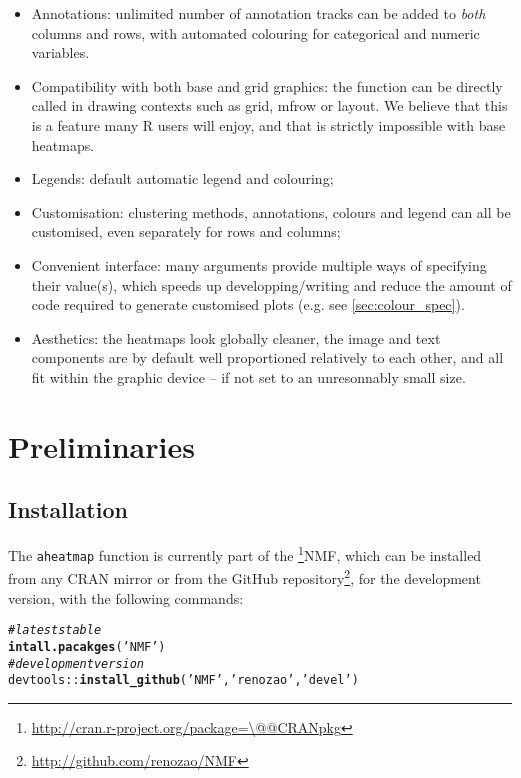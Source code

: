 \documentclass[a4paper]{article}\usepackage[]{graphicx}\usepackage[]{color}
\makeatletter
\newcommand{\hlstr}[1]{\textcolor[rgb]{0.192,0.494,0.8}{#1}}%
\newcommand{\hlcom}[1]{\textcolor[rgb]{0.678,0.584,0.686}{\textit{#1}}}%
\newcommand{\hlstd}[1]{\textcolor[rgb]{0.345,0.345,0.345}{#1}}%
\newcommand{\hlkwd}[1]{\textcolor[rgb]{0.737,0.353,0.396}{\textbf{#1}}}%
\newenvironment{kframe}{%
 \def\at@end@of@kframe{}%
 \ifinner\ifhmode%
  \def\at@end@of@kframe{\end{minipage}}%
  \begin{minipage}{\columnwidth}%
 \fi\fi%
 \def\FrameCommand##1{\hskip\@totalleftmargin \hskip-\fboxsep
 \colorbox{shadecolor}{##1}\hskip-\fboxsep
     \hskip-\linewidth \hskip-\@totalleftmargin \hskip\columnwidth}%
 \MakeFramed {\advance\hsize-\width
   \@totalleftmargin\z@ \linewidth\hsize
   \@setminipage}}%
 {\par\unskip\endMakeFramed%
 \at@end@of@kframe}
\newenvironment{knitrout}{}{} %
\let\code=\texttt
\newcommand{\pkgname}[1]{\textit{#1}\xspace}
\newcommand{\CRANurl}[1]{\url{http://cran.r-project.org/package=#1}}
\def\CRANpkg{\@ifstar\@CRANpkg\@@CRANpkg}
\def\@CRANpkg#1{\href{http://cran.r-project.org/package=#1}{\pkgname{#1}}\footnote{\CRANurl{#1}}}
\def\@@CRANpkg#1{\href{http://cran.r-project.org/package=#1}{\pkgname{#1}} package\footnote{\CRANurl{#1}}}
\newcommand{\footurl}[1]{\footnote{\url{#1}}}
\makeatother
\begin{document}
\begin{itemize}
\item Annotations: unlimited number of annotation tracks can be added to 
\emph{both} columns and rows, with automated colouring for categorical and 
numeric variables.
\item Compatibility with both base and grid graphics: the function can be 
directly called in drawing contexts such as grid, mfrow or layout.
We believe that this is a feature many R users will enjoy, and that is
strictly impossible with base heatmaps.
\item Legends: default automatic legend and colouring;
\item Customisation: clustering methods, annotations, colours and legend can all 
be customised, even separately for rows and columns;
\item Convenient interface: many arguments provide multiple ways of 
specifying their value(s), which speeds up developping/writing and reduce the 
amount of code required to generate customised plots (e.g. see
\cref{sec:colour_spec}).
\item Aesthetics: the heatmaps look globally cleaner, the image and text components 
are by default well proportioned relatively to each other, and all fit within 
the graphic device -- if not set to an unresonnably small size.
\end{itemize}

\section{Preliminaries}

\subsection{Installation}

The \code{aheatmap} function is currently part of the \CRANpkg{NMF}, which can
be installed from any CRAN mirror or from the GitHub
repository\footurl{http://github.com/renozao/NMF}, for the development version,
with the following commands:

\begin{knitrout}\small
{}\color{fgcolor}\begin{kframe}
\begin{alltt}
\hlcom{# latest stable}
\hlkwd{intall.pacakges}\hlstd{(}\hlstr{'NMF'}\hlstd{)}
\hlcom{# development version}
\hlstd{devtools::}\hlkwd{install_github}\hlstd{(}\hlstr{'NMF'}\hlstd{,} \hlstr{'renozao'}\hlstd{,} \hlstr{'devel'}\hlstd{)}
\end{alltt}
\end{kframe}
\end{knitrout}
\end{document}
